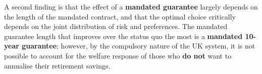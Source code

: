 \documentclass[11pt]{article}
\numberwithin{equation}{section}
\begin{document}
A second finding is that the effect of a \textbf{mandated guarantee} largely depends on the length of the mandated contract, and that the optimal choice critically depends on the joint distribution of risk and preferences.
The mandated guarantee length that improves over the status quo the most is a \textbf{mandated 10-year guarantee}; however, by the compulsory nature of the UK system, it is not possible to account for the welfare response of those who \textbf{do not} want to annualise their retirement savings.
\end{document}
